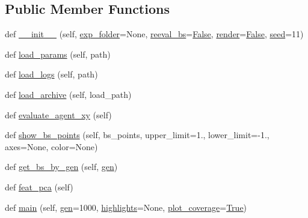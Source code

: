 \subsection*{Public Member Functions}
\begin{DoxyCompactItemize}
\item 
def \hyperlink{classcov__map_1_1_coverage_map_ae841c688fa369981d2f3fd5762756a31}{\+\_\+\+\_\+init\+\_\+\+\_\+} (self, \hyperlink{namespacecov__map_a6abf1f7b9a34fd9cdd53083bf0590d44}{exp\+\_\+folder}=None, \hyperlink{classcov__map_1_1_coverage_map_af44582dd33ed5806aa162e2f0b18ea62}{reeval\+\_\+bs}=\hyperlink{namespacecov__map_af3d7cb622261ac223785ce49937d4e20}{False}, \hyperlink{namespacecov__map_a1e289e3c9d61b6dcadc52f55a2f37d4b}{render}=\hyperlink{namespacecov__map_af3d7cb622261ac223785ce49937d4e20}{False}, \hyperlink{classcov__map_1_1_coverage_map_aa8bf1edd9453a41f261f571b6022a9fb}{seed}=11)
\item 
def \hyperlink{classcov__map_1_1_coverage_map_acd995cd9b66f8cfe11b554305f2c5366}{load\+\_\+params} (self, path)
\item 
def \hyperlink{classcov__map_1_1_coverage_map_a2c6d7b44bd035b1e3d8bf2dfaa710d4c}{load\+\_\+logs} (self, path)
\item 
def \hyperlink{classcov__map_1_1_coverage_map_a8323195ad258e887624d87e3e7f4b149}{load\+\_\+archive} (self, load\+\_\+path)
\item 
def \hyperlink{classcov__map_1_1_coverage_map_a2a063b01dbfd5ff0dedcb1e632ce0afa}{evaluate\+\_\+agent\+\_\+xy} (self)
\item 
def \hyperlink{classcov__map_1_1_coverage_map_a1a03932556ced0baba94b646436a2e0b}{show\+\_\+bs\+\_\+points} (self, bs\+\_\+points, upper\+\_\+limit=1., lower\+\_\+limit=-\/1., axes=None, color=None)
\item 
def \hyperlink{classcov__map_1_1_coverage_map_aa3e1456d585f18483d96cb48a0ca56b4}{get\+\_\+bs\+\_\+by\+\_\+gen} (self, \hyperlink{namespacecov__map_a27d29e4b7835e4d69f6c88ece0ab78db}{gen})
\item 
def \hyperlink{classcov__map_1_1_coverage_map_a2e1498fa2f24f1ecd479c2e095669a1c}{feat\+\_\+pca} (self)
\item 
def \hyperlink{classcov__map_1_1_coverage_map_ab68eec06addb54e213f0f8f3bb4e6fbf}{main} (self, \hyperlink{namespacecov__map_a27d29e4b7835e4d69f6c88ece0ab78db}{gen}=1000, \hyperlink{namespacecov__map_ae1cf0882e67e4f554cd94304a56fb55e}{highlights}=None, \hyperlink{namespacecov__map_a01011b7e6ed59223d9c57f074eb23d9c}{plot\+\_\+coverage}=\hyperlink{namespacecov__map_a3c03983c9333ef2283ff567f15beadeb}{True})
\end{DoxyCompactItemize}
